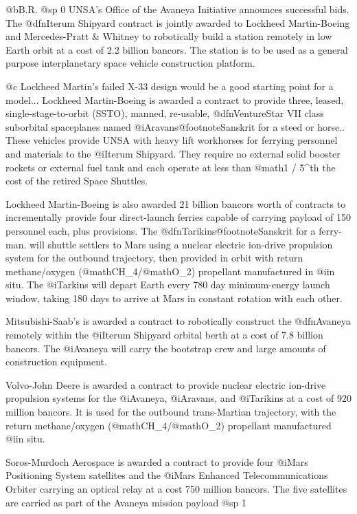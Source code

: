 @b{B.R.}
@sp 0
UNSA's Office of the Avaneya Initiative announces successful bids. The @dfn{Iterum Shipyard} contract is jointly awarded to Lockheed Martin-Boeing and Mercedes-Pratt & Whitney to robotically build a station remotely in low Earth orbit at a cost of 2.2 billion bancors. The station is to be used as a general purpose interplanetary space vehicle construction platform.

@c Lockheed Martin's failed X-33 design would be a good starting point for a model...
Lockheed Martin-Boeing is awarded a contract to provide three, leased, single-stage-to-orbit (SSTO), manned, re-usable, @dfn{VentureStar VII} class suborbital spaceplanes named @i{Aravans}@footnote{Sanskrit for a steed or horse.}. These vehicles provide UNSA with heavy lift workhorses for ferrying personnel and materials to the @i{Iterum Shipyard}. They require no external solid booster rockets or external fuel tank and each operate at less than @math{{1 / 5}^{th} } the cost of the retired Space Shuttles.

Lockheed Martin-Boeing is also awarded 21 billion bancors worth of contracts to incrementally provide four direct-launch ferries capable of carrying payload of 150 personnel each, plus provisions. The @dfn{Tarikins}@footnote{Sanskrit for a ferry-man.} will shuttle settlers to Mars using a nuclear electric ion-drive propulsion system for the outbound trajectory, then provided in orbit with return methane/oxygen (@math{CH_4}/@math{O_2}) propellant manufactured in @i{in situ}. The @i{Tarkins} will depart Earth every 780 day minimum-energy launch window, taking 180 days to arrive at Mars in constant rotation with each other.

Mitsubishi-Saab's is awarded a contract to robotically construct the @dfn{Avaneya} remotely within the @i{Iterum Shipyard} orbital berth at a cost of 7.8 billion bancors. The @i{Avaneya} will carry the bootstrap crew and large amounts of construction equipment.

Volvo-John Deere is awarded a contract to provide nuclear electric ion-drive propulsion systems for the @i{Avaneya}, @i{Aravans}, and @i{Tarikins} at a cost of 920 million bancors. It is used for the outbound trans-Martian trajectory, with the return methane/oxygen (@math{CH_4}/@math{O_2}) propellant manufactured @i{in situ}.

Soros-Murdoch Aerospace is awarded a contract to provide four @i{Mars Positioning System} satellites and the @i{Mars Enhanced Telecommunications Orbiter} carrying an optical relay at a cost 750 million bancors. The five satellites are carried as part of the Avaneya mission payload
@sp 1

